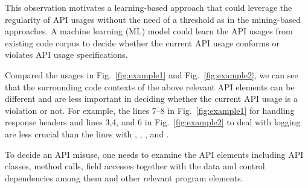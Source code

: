 This observation motivates a learning-based approach that could
leverage the regularity of API usages without the need of a threshold
as in the mining-based approaches. A machine learning (ML) model could
learn the API usages from existing code corpus to decide whether the
current API usage conforms or violates API usage specifications.

Compared the usages in Fig.~\ref{fig:example1} and
Fig.~\ref{fig:example2}, we can see that the surrounding code contexts
of the above relevant API elements can be different and are less
important in deciding whether the current API usage is a violation or
not. For example, the lines 7--8 in Fig.~\ref{fig:example1} for
handling response headers and lines 3,4, and 6 in
Fig.~\ref{fig:example2} to deal with logging are less crucial than the
lines with , ,
, and .

\begin{Observation}
To decide an API misuse, one needs to examine the API elements
including API classes, method calls, field accesses together with the
data and control dependencies among them and other relevant program
elements.
\end{Observation}

